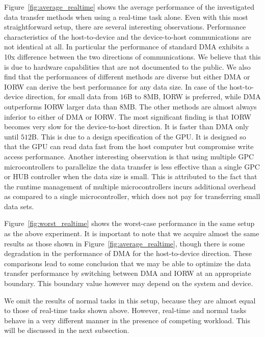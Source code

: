 Figure~\ref{fig:average_realtime} shows the average performance of the
investigated data transfer methods when using a real-time task alone.
Even with this most straightforward setup, there are several interesting
observations.
Performance characteristics of the host-to-device and the device-to-host
communications are not identical at all.
In particular the performance of standard DMA exhibits a 10x difference
between the two directions of communications.
We believe that this is due to hardware capabilities that are not
documented to the public.
We also find that the performances of different methods are diverse but
either \textsf{DMA} or \textsf{IORW} can derive the best performance for
any data size.
In case of the host-to-device direction, for small data from $16$B to
$8$MB, \textsf{IORW} is preferred, while \textsf{DMA} outperforms
\textsf{IORW} larger data than $8$MB.
The other methods are almost always inferior to either of \textsf{DMA}
or \textsf{IORW}.
The most significant finding is that \textsf{IORW} becomes very slow for
the device-to-host direction.
It is faster than \textsf{DMA} only until $512$B.
This is due to a design specification of the GPU.
It is designed so that the GPU can read data fast from the host computer
but compromise write access performance.
Another interesting observation is that using multiple GPC
microcontrollers to parallelize the data transfer is less effective than
a single GPC or HUB controller when the data size is small.
This is attributed to the fact that the runtime management of multiple
microcontrollers incurs additional overhead as compared to a single
microcontroller, which does not pay for transferring small data sets.

Figure~\ref{fig:worst_realtime} shows the worst-case performance in
the same setup as the above experiment.
It is important to note that we acquire almost the same results as those
shown in Figure~\ref{fig:average_realtime}, though there is
some degradation in the performance of \textsf{DMA} for the
host-to-device direction.
These comparisons lead to some conclusion that we may be able to
optimize the data transfer performance by switching between \textsf{DMA}
and \textsf{IORW} at an appropriate boundary.
This boundary value however may depend on the system and device.

We omit the results of normal tasks in this setup, because they are
almost equal to those of real-time tasks shown above.
However, real-time and normal tasks behave in a very different manner in
the presence of competing workload.
This will be discussed in the next subsection.

